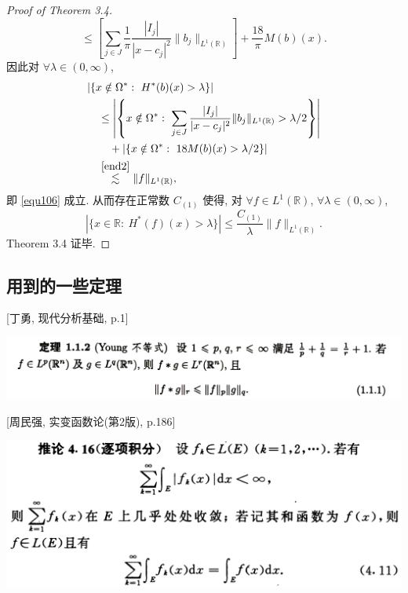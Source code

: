 \documentclass[a4paper,11pt]{article}
\theoremstyle{definition}
\begin{document}
\begin{proof}[Proof of Theorem 3.4]
$$            \leq \left[ \sum_{j \in J} \frac{1}{\pi} \frac{|I_j|}{|x - c_j|^2} \|b_j\|_{L^1(\mathbb{R})} \right] 
                + \frac{18}{\pi}  M (b)(x).
    $$
    因此对 $ \forall \lambda \in (0, \infty) $,
    \begin{align*}
        &|\{x \notin \Omega^*:\ H^* (b)(x) > \lambda \}| \\
            &\quad\leq \left|\left\{x \notin \Omega^*:\ 
                \sum_{j \in J} \frac{|I_j|}{|x - c_j|^2} \|b_j\|_{L^1(\mathbb{R})} > \lambda / 2 \right\}\right| \\
                &\qquad + |\{x \notin \Omega^*:\ 18 M (b)(x) > \lambda / 2 \}| \\
            &\quad\overset{\eqref{end2}}{\lesssim} \|f\|_{L^1(\mathbb{R})},
    \end{align*}
    即 \eqref{equ106} 成立. 
    从而存在正常数 $ C_{(1)} $ 使得, 对 $ \forall f \in L^1(\mathbb{R})  $, 
    $ \forall \lambda \in (0, \infty) $,
    \begin{equation} \label{equ110}
        |\{x \in \mathbb{R}:\ H^* (f)(x) > \lambda \}|
            \leq \frac{C_{(1)}}{\lambda} \|f\|_{L^1(\mathbb{R})}.
    \end{equation}
    Theorem 3.4 证毕.
\end{proof}

\newpage

\subsection*{用到的一些定理}

\begin{framed}
\setlength{\parindent}{0pt}
[丁勇, 现代分析基础, p.1]
\vspace{0.1cm}

\includegraphics[width=\textwidth]{picture/young.PNG}
\end{framed}

\begin{framed}
\setlength{\parindent}{0pt}
[周民强, 实变函数论(第2版), p.186]
\vspace{0.1cm}
    
\includegraphics[width=\textwidth]{picture/add.PNG}
\end{framed}
\end{document}
